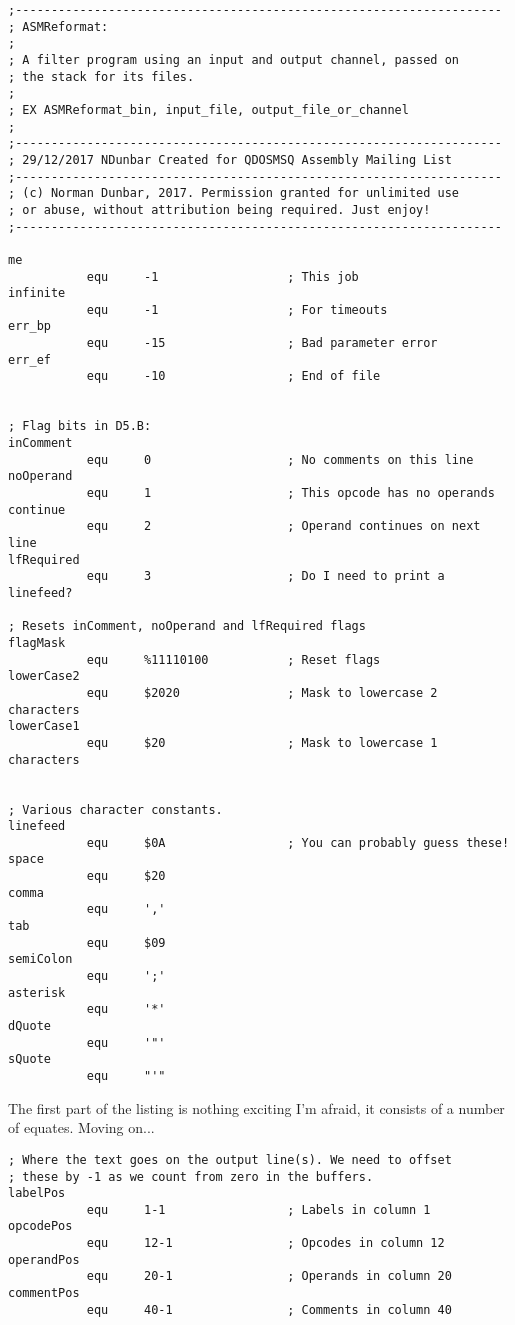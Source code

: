 \begin{lstlisting}[firstnumber=1,caption={ASMReformat Source - Equates etc}]
;--------------------------------------------------------------------
; ASMReformat:
;
; A filter program using an input and output channel, passed on
; the stack for its files.
; 
; EX ASMReformat_bin, input_file, output_file_or_channel
;
;--------------------------------------------------------------------
; 29/12/2017 NDunbar Created for QDOSMSQ Assembly Mailing List
;--------------------------------------------------------------------
; (c) Norman Dunbar, 2017. Permission granted for unlimited use
; or abuse, without attribution being required. Just enjoy!
;--------------------------------------------------------------------

me
           equ     -1                  ; This job
infinite
           equ     -1                  ; For timeouts
err_bp
           equ     -15                 ; Bad parameter error
err_ef
           equ     -10                 ; End of file


; Flag bits in D5.B:
inComment
           equ     0                   ; No comments on this line
noOperand
           equ     1                   ; This opcode has no operands
continue
           equ     2                   ; Operand continues on next line
lfRequired
           equ     3                   ; Do I need to print a linefeed?

; Resets inComment, noOperand and lfRequired flags
flagMask
           equ     %11110100           ; Reset flags
lowerCase2
           equ     $2020               ; Mask to lowercase 2 characters
lowerCase1
           equ     $20                 ; Mask to lowercase 1 characters


; Various character constants.
linefeed
           equ     $0A                 ; You can probably guess these!
space
           equ     $20
comma
           equ     ','
tab
           equ     $09
semiColon
           equ     ';'
asterisk
           equ     '*'
dQuote
           equ     '"'
sQuote
           equ     "'"
\end{lstlisting}

The first part of the listing is nothing exciting I'm afraid, it consists of a number of equates. Moving on...

\begin{lstlisting}[firstnumber=last,caption={ASMReformat Source - Configuration Section}]
; Where the text goes on the output line(s). We need to offset
; these by -1 as we count from zero in the buffers.
labelPos
           equ     1-1                 ; Labels in column 1
opcodePos
           equ     12-1                ; Opcodes in column 12
operandPos
           equ     20-1                ; Operands in column 20
commentPos
           equ     40-1                ; Comments in column 40
\end{lstlisting}

